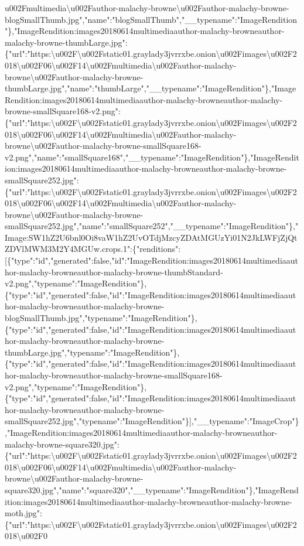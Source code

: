{}u002Fmultimedia\textbackslash{}u002Fauthor-malachy-browne\textbackslash{}u002Fauthor-malachy-browne-blogSmallThumb.jpg","name":"blogSmallThumb","\_\_typename":"ImageRendition"\},"ImageRendition:images20180614multimediaauthor-malachy-browneauthor-malachy-browne-thumbLarge.jpg":\{"url":"https:\textbackslash{}u002F\textbackslash{}u002Fstatic01.graylady3jvrrxbe.onion\textbackslash{}u002Fimages\textbackslash{}u002F2018\textbackslash{}u002F06\textbackslash{}u002F14\textbackslash{}u002Fmultimedia\textbackslash{}u002Fauthor-malachy-browne\textbackslash{}u002Fauthor-malachy-browne-thumbLarge.jpg","name":"thumbLarge","\_\_typename":"ImageRendition"\},"ImageRendition:images20180614multimediaauthor-malachy-browneauthor-malachy-browne-smallSquare168-v2.png":\{"url":"https:\textbackslash{}u002F\textbackslash{}u002Fstatic01.graylady3jvrrxbe.onion\textbackslash{}u002Fimages\textbackslash{}u002F2018\textbackslash{}u002F06\textbackslash{}u002F14\textbackslash{}u002Fmultimedia\textbackslash{}u002Fauthor-malachy-browne\textbackslash{}u002Fauthor-malachy-browne-smallSquare168-v2.png","name":"smallSquare168","\_\_typename":"ImageRendition"\},"ImageRendition:images20180614multimediaauthor-malachy-browneauthor-malachy-browne-smallSquare252.jpg":\{"url":"https:\textbackslash{}u002F\textbackslash{}u002Fstatic01.graylady3jvrrxbe.onion\textbackslash{}u002Fimages\textbackslash{}u002F2018\textbackslash{}u002F06\textbackslash{}u002F14\textbackslash{}u002Fmultimedia\textbackslash{}u002Fauthor-malachy-browne\textbackslash{}u002Fauthor-malachy-browne-smallSquare252.jpg","name":"smallSquare252","\_\_typename":"ImageRendition"\},"Image:SW1hZ2U6bnl0Oi8vaW1hZ2UvOTdjMzcyZDAtMGUzYi01N2JkLWFjZjQtZDVlMWM3M2Y4MGUw.crops.1":\{"renditions":{[}\{"type":"id","generated":false,"id":"ImageRendition:images20180614multimediaauthor-malachy-browneauthor-malachy-browne-thumbStandard-v2.png","typename":"ImageRendition"\},\{"type":"id","generated":false,"id":"ImageRendition:images20180614multimediaauthor-malachy-browneauthor-malachy-browne-blogSmallThumb.jpg","typename":"ImageRendition"\},\{"type":"id","generated":false,"id":"ImageRendition:images20180614multimediaauthor-malachy-browneauthor-malachy-browne-thumbLarge.jpg","typename":"ImageRendition"\},\{"type":"id","generated":false,"id":"ImageRendition:images20180614multimediaauthor-malachy-browneauthor-malachy-browne-smallSquare168-v2.png","typename":"ImageRendition"\},\{"type":"id","generated":false,"id":"ImageRendition:images20180614multimediaauthor-malachy-browneauthor-malachy-browne-smallSquare252.jpg","typename":"ImageRendition"\}{]},"\_\_typename":"ImageCrop"\},"ImageRendition:images20180614multimediaauthor-malachy-browneauthor-malachy-browne-square320.jpg":\{"url":"https:\textbackslash{}u002F\textbackslash{}u002Fstatic01.graylady3jvrrxbe.onion\textbackslash{}u002Fimages\textbackslash{}u002F2018\textbackslash{}u002F06\textbackslash{}u002F14\textbackslash{}u002Fmultimedia\textbackslash{}u002Fauthor-malachy-browne\textbackslash{}u002Fauthor-malachy-browne-square320.jpg","name":"square320","\_\_typename":"ImageRendition"\},"ImageRendition:images20180614multimediaauthor-malachy-browneauthor-malachy-browne-moth.jpg":\{"url":"https:\textbackslash{}u002F\textbackslash{}u002Fstatic01.graylady3jvrrxbe.onion\textbackslash{}u002Fimages\textbackslash{}u002F2018\textbackslash{}u002F0